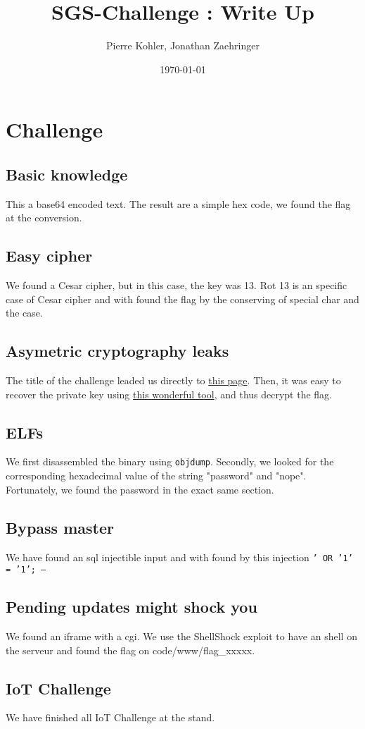 \documentclass[a4paper]{article}
\title{SGS-Challenge : Write Up}
\author{Pierre Kohler, Jonathan Zaehringer}
\date{\today}
\newcommand{\code}[1]{\colorbox{light-gray}{\texttt{#1}}}
\begin{document}
\maketitle


\section{Challenge}
\label{sec:questions}


\subsection{Basic knowledge}
This a base64 encoded text. The result are a simple hex code, we found the flag at the conversion.

\subsection{Easy cipher}
We found a Cesar cipher, but in this case, the key was 13. Rot 13 is an specific case of Cesar cipher and with found the flag by the conserving of special char and the case.

\subsection{Asymetric cryptography leaks}
The title of the challenge leaded us directly to \href{https://en.wikipedia.org/wiki/Public-key_cryptography#Recovery_from_a_leaked_key}{this page}. Then, it was easy to recover the private key using \href{https://github.com/Ganapati/RsaCtfTool}{this wonderful tool}, and thus decrypt the flag.

\subsection{ELFs}
We first disassembled the binary using \code{objdump}. Secondly, we looked for the corresponding hexadecimal value of the string "password" and "nope". Fortunately, we found the password in the exact same section.

\subsection{Bypass master}
We have found an sql injectible input and with found by this injection \code{' OR '1' = '1'; --}

\subsection{Pending updates might shock you}
We found an iframe with a cgi. We use the ShellShock exploit to have an shell on the serveur and found the flag on code{/www/flag\_xxxxx}.

\subsection{IoT Challenge}
We have finished all IoT Challenge at the stand.
\end{document}
